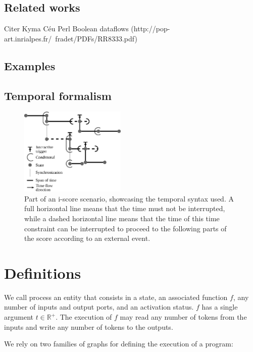 \documentclass{article}
\begin{document}
    \subsection{Related works}
    Citer Kyma
    Céu
    Perl
    Boolean dataflows (http://pop-art.inrialpes.fr/~fradet/PDFs/RR8333.pdf)
    
    \subsection{Examples}
    
    \subsection{Temporal formalism}
    
    \begin{figure}
        \centering
        \includegraphics[width=0.45\textwidth]{images/iscore-example.eps}
        \caption{Part of an i-score scenario, showcasing the temporal syntax used. 
            A full horizontal line means that the time must not be interrupted, 
            while a dashed horizontal line means that the time of this time constraint can be interrupted to proceed 
            to the following parts of the score according to an external event.}
        \label{fig.iscore-example}
    \end{figure}
    
    \section{Definitions}
    We call process an entity that consists in a state, an associated function $f$, any number of inputs and output ports, and an activation status.
    $f$ has a single argument $t \in \mathbb{R^+}$.
    The execution of $f$ may read any number of tokens from the inputs and write any number of tokens to the outputs.
    
    We rely on two families of graphs for defining the execution of a program:
    
\end{document}
